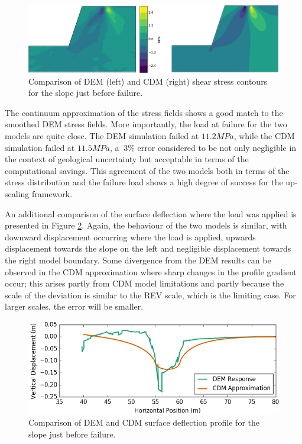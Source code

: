\begin{figure}[!htb]
\begin{center}
\includegraphics[width=\textwidth]{figures/Chapter5/ShearStressContours}
\caption{{\label{fig:S12DNS} Comparison of DEM (left) and CDM (right) shear stress contours for the slope just before failure.%
}}
\end{center}
\end{figure}

The continuum approximation of the stress fields shows a good match to the smoothed DEM stress fields. More importantly, the load at failure for the two models are quite close. The DEM simulation failed at $11.2 MPa$, while the CDM simulation failed at $11.5 MPa$, a $~3\%$ error considered to be not only negligible in the context of geological uncertainty but acceptable in terms of the computational savings. This agreement of the two models both in terms of the stress distribution and the failure load shows a high degree of success for the up-scaling framework. 

An additional comparison of the surface deflection where the load was applied is presented in Figure \ref{fig:surfacedeflection}. Again, the behaviour of the two models is similar, with downward displacement occurring where the load is applied, upwards displacement towards the slope on the left and negligible displacement towards the right model boundary. Some divergence from  the DEM results can be observed in the CDM approximation where sharp changes in the profile gradient occur; this arises partly from CDM model limitations and partly because the scale of the deviation is similar to the REV scale, which is the limiting case. For larger scales, the error will be smaller.

\begin{figure}[!htb]
\begin{center}
\includegraphics[width=\textwidth]{figures/Chapter5/SurfaceDeflection}
\caption{{\label{fig:surfacedeflection} Comparison of DEM and CDM surface deflection profile for the slope just before failure.%
}}
\end{center}
\end{figure}

